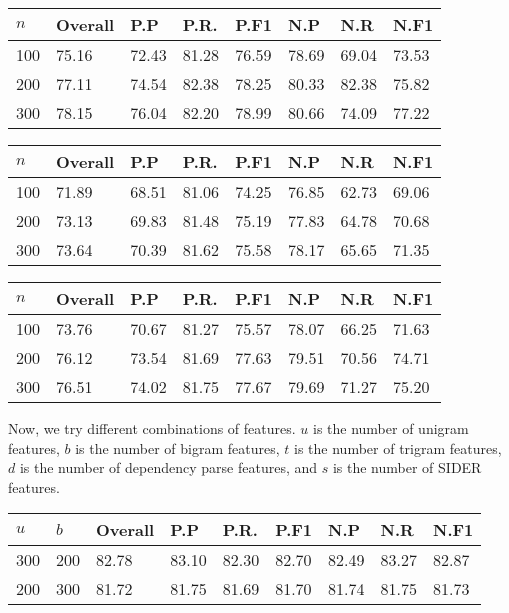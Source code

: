 \documentclass{acm_proc_article-sp}
\begin{document}
\vspace{-3mm}
\begin{tabular}{| l | l | l | l | l | l | l | l |}
\hline
$n$ & Overall & P.P & P.R. & P.F1 & N.P & N.R & N.F1 \\ \hline
100 & 75.16 & 72.43 & 81.28 & 76.59 & 78.69 & 69.04 & 73.53 \\ \hline
200 & 77.11 & 74.54 & 82.38 & 78.25 & 80.33 & 82.38 & 75.82 \\ \hline
300 & 78.15 & 76.04 & 82.20 & 78.99 & 80.66 & 74.09 & 77.22 \\ \hline
\end{tabular} 

\vspace{-3mm}
\begin{tabular}{| l | l | l | l | l | l | l | l |}
\hline
$n$ & Overall & P.P & P.R. & P.F1 & N.P & N.R & N.F1 \\ \hline
100 & 71.89 & 68.51 & 81.06 & 74.25 & 76.85 & 62.73 & 69.06 \\ \hline
200 & 73.13 & 69.83 & 81.48 & 75.19 & 77.83 & 64.78 & 70.68 \\ \hline
300 & 73.64 & 70.39 & 81.62 & 75.58 & 78.17 & 65.65 & 71.35 \\ \hline
\end{tabular}

\vspace{-3mm}
\begin{tabular}{| l | l | l | l | l | l | l | l |}
\hline
$n$ & Overall & P.P & P.R. & P.F1 & N.P & N.R & N.F1 \\ \hline
100 & 73.76 & 70.67 & 81.27 & 75.57 & 78.07 & 66.25 & 71.63 \\ \hline
200 & 76.12 & 73.54 & 81.69 & 77.63 & 79.51 & 70.56 & 74.71\\ \hline
300 & 76.51 & 74.02 & 81.75 & 77.67 & 79.69 & 71.27 & 75.20 \\ \hline
\end{tabular} 
\newpage

Now, we try different combinations of features. $u$ is the number of unigram features, $b$ is the number of bigram features, $t$ is the number of trigram features, $d$ is the number of dependency parse features, and $s$ is the number of SIDER features.
\vspace{-3mm}
\tabcolsep=0.11cm
\begin{tabular}{| l | l | l | l | l | l | l | l | l |}
\hline
$u$ & $b$ & Overall & P.P & P.R. & P.F1 & N.P & N.R & N.F1 \\ \hline
300 & 200 & 82.78 & 83.10 & 82.30 & 82.70 & 82.49 & 83.27 & 82.87 \\ \hline
200 & 300 & 81.72 & 81.75 & 81.69 & 81.70 & 81.74 & 81.75 & 81.73 \\ \hline
\end{tabular} 
\end{document}
